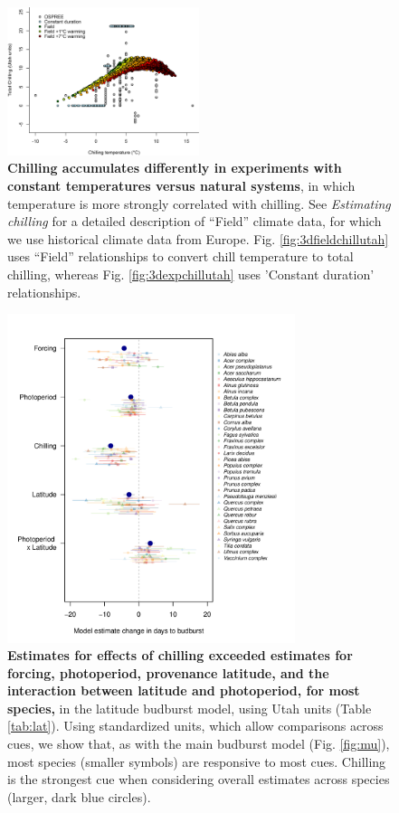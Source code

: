 \documentclass{article}
\begin{document}
\begin{figure}[h!]
\centering
\noindent \includegraphics[width=0.50\textwidth]{..//..//analyses/bb_analysis/figures/exp_vs_field_chill_withwarmingcols.png}
\caption{\textbf{Chilling accumulates differently in experiments with constant temperatures versus natural systems}, in which temperature is more strongly correlated with chilling. See \emph{Estimating chilling} for a detailed description of ``Field'' climate data, for which we use historical climate data from Europe. Fig. \ref{fig:3dfieldchillutah} uses ``Field'' relationships to convert chill temperature to total chilling, whereas Fig. \ref{fig:3dexpchillutah} uses 'Constant duration' relationships.}
\label{fig:chillexpfield}
\end{figure}


\begin{figure}[h!]
\centering
\noindent \includegraphics[width=0.75\textwidth]{..//..//analyses/lat_analysis/figures/latanalysis_spcom_expramp_fp.pdf}
\caption{\textbf{Estimates for effects of chilling exceeded estimates for forcing, photoperiod, provenance latitude, and the interaction between latitude and photoperiod, for most species,} in the latitude budburst model, using Utah units (Table \ref{tab:lat}). Using standardized units, which allow comparisons across cues, we show that, as with the main budburst model (Fig. \ref{fig:mu}), most species (smaller symbols) are responsive to most cues. Chilling is the strongest cue when considering overall estimates across species (larger, dark blue circles).}
\label{fig:lat}
\end{figure}
\end{document}
